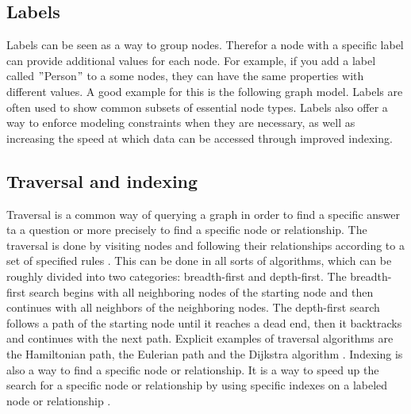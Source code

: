 \subsection{Labels} \label{subsec:labels}
Labels can be seen as a way to group nodes.
Therefor a node with a specific label can provide additional values for each node.
For example, if you add a label called \("\)Person\("\) to a some nodes, they can have the same properties with different values.
A good example for this is the following graph model.
Labels are often used to show common subsets of essential node types.
Labels also offer a way to enforce modeling constraints when they are necessary, as well as increasing the speed at which data
can be accessed through improved indexing. \parencite[compare P. 6f.]{PractivalNeo4j}

\subsection{Traversal and indexing}\label{subsec:traversal-and-indexing}
Traversal is a common way of querying a graph in order to find a specific answer ta a question or more precisely to find a
specific node or relationship.
The traversal is done by visiting nodes and following their relationships according to a set of specified rules \parencite[compare P.7 ]{PractivalNeo4j}.
This can be done in all sorts of algorithms, which can be roughly divided into two categories: breadth-first and depth-first.
The breadth-first  search begins with all neighboring nodes of the starting node and then continues with all neighbors of the neighboring nodes.
The depth-first search follows a path of the starting node until it reaches a dead end, then it backtracks and continues with the next path.
Explicit examples of traversal algorithms are the Hamiltonian path, the Eulerian path and the Dijkstra algorithm \parencite[compare]{juypiter:Graph}.
Indexing is also a way to find a specific node or relationship.
It is a way to speed up the search for a specific node or relationship by using specific indexes on a labeled node or relationship \parencite[compare P.7 ]{PractivalNeo4j}.